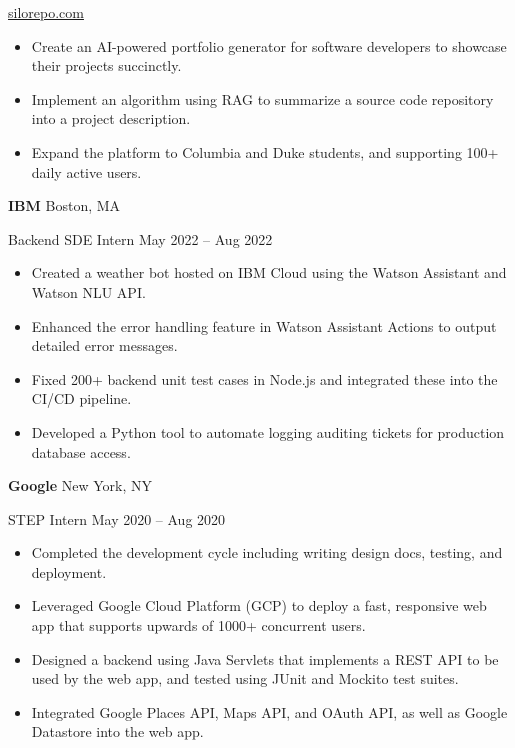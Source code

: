 \documentclass[11pt]{article}
\newcommand{\resumeentry}[4]{%
\textbf{#1} \hfill {\small #2}
\par
{\small #3} \hfill {\small #4}}
\begin{document}
{\small \href{https://www.silorepo.com/}{silorepo.com}}

\begin{itemize}
  \item Create an AI-powered portfolio generator for software developers to showcase their projects succinctly.
  \item Implement an algorithm using RAG to summarize a source code repository into a project description.
  \item Expand the platform to Columbia and Duke students, and supporting 100+ daily active users.
\end{itemize}

\smallskip

\resumeentry{IBM}{Boston, MA}{Backend SDE Intern}{May 2022 -- Aug 2022}
\begin{itemize}
  \item Created a weather bot hosted on IBM Cloud using the Watson Assistant and Watson NLU API.
  \item Enhanced the error handling feature in Watson Assistant Actions to output detailed error messages.
  \item Fixed 200+ backend unit test cases in Node.js and integrated these into the CI/CD pipeline.
  \item Developed a Python tool to automate logging auditing tickets for production database access.
\end{itemize}

\smallskip

\resumeentry{Google}{New York, NY}{STEP Intern}{May 2020 -- Aug 2020}
\begin{itemize}
  \item Completed the development cycle including writing design docs, testing, and deployment.
  \item Leveraged Google Cloud Platform (GCP) to deploy a fast, responsive web app that supports upwards of 1000+ concurrent users.
  \item Designed a backend using Java Servlets that implements a REST API to be used by the web app, and tested using JUnit and Mockito test suites.
  \item Integrated Google Places API, Maps API, and OAuth API, as well as Google Datastore into the web app.
\end{itemize}

\end{document}
